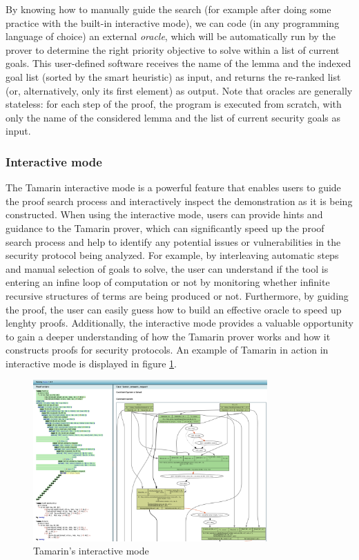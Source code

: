 \documentclass{article}
\begin{document}
By knowing how to manually guide the search (for example after doing some practice with the built-in interactive mode), we can code (in any programming language of choice) an external \textit{oracle}, which will be automatically run by the prover to determine the right priority objective to solve within a list of current goals. This user-defined software receives the name of the lemma and the indexed goal list (sorted by the smart heuristic) as input, and returns the re-ranked list (or, alternatively, only its first element) as output. Note that oracles are generally stateless: for each step of the proof, the program is executed from scratch, with only the name of the considered lemma and the list of current security goals as input.

\subsubsection{Interactive mode}\label{subsec:tamarinGui}

The Tamarin interactive mode is a powerful feature that enables users to guide the proof search process and interactively inspect the demonstration as it is being constructed. When using the interactive mode, users can provide hints and guidance to the Tamarin prover, which can significantly speed up the proof search process and help to identify any potential issues or vulnerabilities in the security protocol being analyzed. For example, by interleaving automatic steps and manual selection of goals to solve, the user can understand if the tool is entering an infine loop of computation or not by monitoring whether infinite recursive structures of terms are being produced or not. Furthermore, by guiding the proof, the user can easily guess how to build an effective oracle to speed up lenghty proofs. Additionally, the interactive mode provides a valuable opportunity to gain a deeper understanding of how the Tamarin prover works and how it constructs proofs for security protocols. An example of Tamarin in action in interactive mode is displayed in figure \ref{fig:interactive}.

\begin{figure}
    \centering
    \includegraphics[width=0.8\textwidth]{images/gui.png}
    \caption{Tamarin's interactive mode}
    \label{fig:interactive}
\end{figure}
\end{document}
